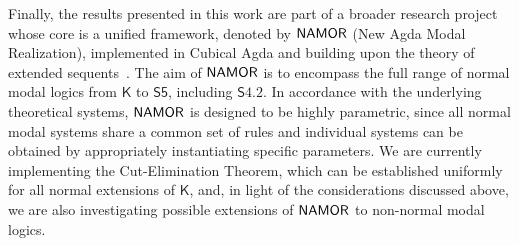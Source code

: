 \documentclass{article}
\newcommand{\logic}{\mathsf{S4.2}}
\newcommand{\axname}[1]{\mathsf{#1}}
\newcommand{\commento}[1]{}
\newcommand{\agda}{\textsf{Agda}}
\theoremstyle{definition}
\begin{document}
Finally, the results presented in this work are part of a broader research project whose core is a unified framework, denoted by $\framework$ (\textsf{New Agda Modal Realization}), implemented in Cubical \agda{} and building upon the theory of extended sequents~\cite{Martini2023:CutElimination}. The aim of $\framework$ is to encompass the full range of normal modal logics from $\mathsf{K}$ to $\mathsf{S5}$, including $\logic$. In accordance with the underlying theoretical systems, $\framework$ is designed to be highly parametric, since all normal modal systems share a common set of rules and individual systems can be obtained by appropriately instantiating specific parameters. We are currently implementing the Cut-Elimination Theorem, which can be established uniformly for all normal extensions of $\axname{K}$, and, in light of the considerations discussed above, we are also investigating possible extensions of $\framework$ to non-normal modal logics.

\commento{
\begin{itemize}
    \item We are planning a study of intuitionistic S4.2. From a syntactic point of view, the intuitionistic system can be obtained naturally by restricting sequents to have a single formula on the right side. On the other hand a standard Hilbert style intuitionistic axiomatisation is not known.
 \item We also want to extend the Curry-Howard analogy to the resulting system, to provide a full computational study of the logic.
 \item We aim to develop a more constructive meta-theory and semantics, exploring Beth's models and constructive lattices as alternatives to classical Kripke structures.
 \item This work represents the first step toward the development of a unified framework, $\framework$ (\textsf{New \agda{}~MOdal Realization}), which builds upon the theory of 2-sequents and extended sequents~\cite{Martini2023:CutElimination} and aims to encompass the entire range of normal modal logics from $\mathsf{K}$ to $\mathsf{S}5$. Following the underlying theoretical systems, $\framework$ is designed to be highly parametric, as all normal modal systems share the same set of rules.
\end{itemize}

}
\end{document}
